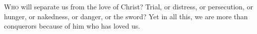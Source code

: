 
\lettrine{W}{ho} will separate us from the love of Christ? Trial, or distress, or persecution, or hunger, or nakedness, or danger, or the sword? Yet in all this, we are more than conquerors because of him who has loved us.